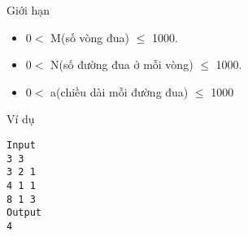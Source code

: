 Giới hạn
\begin{itemize}
	\item     0$<$ M(số vòng đua)  $\le$ 1000.   
	\item     0$<$ N(số đường đua ở mỗi vòng) $\le$ 1000.   
	\item     0$<$ a(chiều dài mỗi đường đua) $\le$ 1000   
\end{itemize}
Ví dụ
\begin{verbatim}
Input
3 3
3 2 1
4 1 1
8 1 3
Output
4
\end{verbatim}